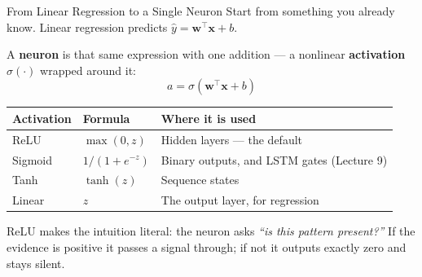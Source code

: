 \documentclass[aspectratio=169, 11pt]{beamer}
\begin{document}
\begin{frame}{From Linear Regression to a Single Neuron}
  Start from something you already know. Linear regression predicts
  $\hat{y} = \mathbf{w}^\top \mathbf{x} + b$.

  \vspace{0.15cm}
  A \textbf{neuron} is that same expression with one addition --- a nonlinear
  \textbf{activation} $\sigma(\cdot)$ wrapped around it:
  \[
    a = \sigma(\mathbf{w}^\top \mathbf{x} + b)
  \]
  \vspace{-0.35cm}
  \begin{center}
    {\footnotesize
    \begin{tabular}{lll}
      \toprule
      \textbf{Activation} & \textbf{Formula} & \textbf{Where it is used} \\
      \midrule
      ReLU    & $\max(0,z)$       & Hidden layers --- the default \\
      Sigmoid & $1/(1+e^{-z})$    & Binary outputs, and LSTM gates (Lecture 9) \\
      Tanh    & $\tanh(z)$        & Sequence states \\
      Linear  & $z$               & The output layer, for regression \\
      \bottomrule
    \end{tabular}
    }
  \end{center}

  \vspace{0.1cm}
  ReLU makes the intuition literal: the neuron asks \emph{``is this pattern present?''} If the
  evidence is positive it passes a signal through; if not it outputs exactly zero and stays
  silent.
\end{frame}
\end{document}
